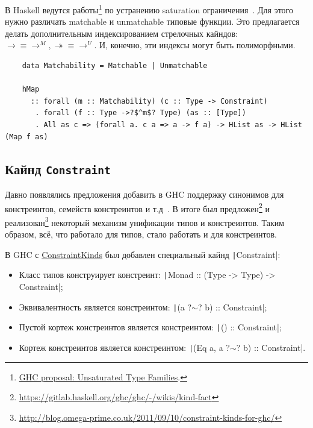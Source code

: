 
В Haskell ведутся работы\footnote{\href{https://ghc-proposals.readthedocs.io/en/latest/proposals/0242-unsaturated-type-families.html}{GHC proposal: Unsaturated Type Families}.} по устранению saturation ограничения~\cite{kiss2019higher}.
Для этого нужно различать matchable и unmatchable типовые функции.
Это предлагается делать дополнительным индексированием стрелочных кайндов: $\to \equiv
\to^M, \twoheadrightarrow \equiv \to^U$.
И, конечно, эти индексы могут быть полиморфными.

\begin{verbatim}
    data Matchability = Matchable | Unmatchable

    hMap
      :: forall (m :: Matchability) (c :: Type -> Constraint)
       . forall (f :: Type ->?$^m$? Type) (as :: [Type])
       . All as c => (forall a. c a => a -> f a) -> HList as -> HList (Map f as)
\end{verbatim}

\subsection{Кайнд \texttt{Constraint}}

Давно появлялись предложения добавить в GHC поддержку синонимов для констреинтов, семейств констреинтов и т.д~\cite{orchard2010haskell}.
В итоге был предложен\footnote{\url{https://gitlab.haskell.org/ghc/ghc/-/wikis/kind-fact}} и реализован\footnote{\url{http://blog.omega-prime.co.uk/2011/09/10/constraint-kinds-for-ghc/}} некоторый механизм унификации типов и констреинтов.
Таким образом, всё, что работало для типов, стало работать и для констреинтов.

В GHC с \href{https://downloads.haskell.org/ghc/9.2-latest/docs/html/users_guide/exts/constraint_kind.html}{ConstraintKinds} был добавлен специальный кайнд \texttt|Constraint|:
\begin{itemize}
    \item Класс типов конструирует констреинт: \texttt|Monad :: (Type -> Type) -> Constraint|;
    \item Эквивалентность является констреинтом: \texttt|(a ?$\sim$? b) :: Constraint|;
    \item Пустой кортеж констреинтов является констреинтом: \texttt|() :: Constraint|;
    \item Кортеж констреинтов является констреинтом: \texttt|(Eq a, a ?$\sim$? b) :: Constraint|.
\end{itemize}

